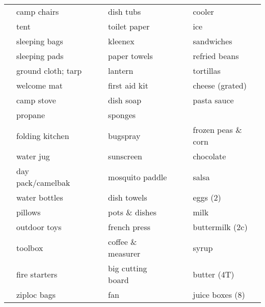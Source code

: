 \documentclass[10pt]{article}
\newcommand{\mybox}{\framebox[4mm]{\textcolor{white} m} \framebox[4mm]{\textcolor{white} m} }
\begin{document}
\pagestyle{empty}



\renewcommand{\arraystretch}{1.5}

\begin{tabular}{rlcrlcrl} \hline
\mybox & camp chairs   &\hspace{13mm}&\mybox & dish tubs   &\hspace{13mm}&\mybox & cooler \\
\mybox & tent                   &    &\mybox & toilet paper         &    &\mybox & ice \\
\mybox & sleeping bags          &    &\mybox & kleenex              &    &\mybox & sandwiches \\
\mybox & sleeping pads          &    &\mybox & paper towels         &    &\mybox & refried beans \\
\mybox & ground cloth; tarp     &    &\mybox & lantern              &    &\mybox & tortillas \\
\mybox & welcome mat            &    &\mybox & first aid kit        &    &\mybox & cheese (grated) \\
\mybox & camp stove             &    &\mybox & dish soap            &    &\mybox & pasta sauce \\
\mybox & propane                &    &\mybox & sponges              &    &\mybox & \\
\mybox & folding kitchen        &    &\mybox & bugspray             &    &\mybox & frozen peas \& corn \\
\mybox & water jug              &    &\mybox & sunscreen            &    &\mybox & chocolate \\
\mybox & day pack/camelbak      &    &\mybox & mosquito paddle      &    &\mybox & salsa \\ \cline{4-5}
\mybox & water bottles          &    &\mybox & dish towels          &    &\mybox & eggs (2) \\
\mybox & pillows                &    &\mybox & pots \& dishes       &    &\mybox & milk \\
\mybox & outdoor toys           &    &\mybox & french press         &    &\mybox & buttermilk (2c) \\ \cline{1-2}
\mybox & toolbox                &    &\mybox & coffee \& measurer   &    &\mybox & syrup \\
\mybox & fire starters          &    &\mybox & big cutting board    &    &\mybox & butter (4T) \\
\mybox & ziploc bags            &    &\mybox & fan                  &    &\mybox & juice boxes (8) \\

\end{tabular}
\end{document}
